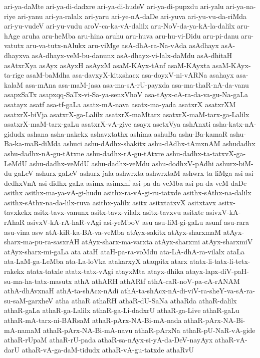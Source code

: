 {ari-ya-daMte
ari-ya-di-dadxre
ari-ya-di-hudeV
ari-ya-di-pupxdu
ari-yalu
ari-ya-na-riye
ari-yanu
ari-ya-ralalx
ari-yaru
ari-ye-nA-daDe
ari-yuva
ari-yu-vu-da-riMda
ari-yu-vudeV
ari-yu-vudu
aroV-ca-ka-vA-dalilx
aru-NoV-da-ya-kA-la-dalilx
aru-hAge
aruha
aru-heMba
aru-hina
aruhu
aru-huva
aru-hu-vi-Didu
aru-pi-danu
aru-vatutx
aru-va-tutx-nAlukx
aru-viMge
asA-dhA-ra-Na-vAda
asAdhayx
asA-dhayxva
asA-dhayx-veM-bu-danunx
asA-dhayx-vi-lalx-daMdu
asA-dhitaH
asAtxrXya
asAyx
asAyxH
asAyxM
asaM-KAyx-tAnf
asaM-KAyxta
asaM-KAyx-ta-rige
asaM-baMdha
asa-davxyX-kitxshacx
asa-doyxV-ni-vARNa
asahayx
asa-kalaM
asa-mAna
asa-maM-jasa
asa-ma-sA-rU-payxda
asa-ma-thaR-nA-da-vanu
asapxSaTx
asapxqq-SaTx-vi-Sa-ya-senxVhoV
asa-tAyx-cA-ra-da-va-gu-Na-gaLa
asatayx
asatf
asa-tf-gaLa
asatx-mA-nava
asatx-ma-yada
asatxrX
asatxrXM
asatxrX-biVja
asatxrX-ga-Lalilx
asatxrX-maMtarx
asatxrX-maM-tarx-ga-Lalilx
asatxrX-maM-tarx-gaLu
asatxrX-vA-give
asayx
asetxVya
ashAnxti
asha-katx-nA-gidudx
ashana
asha-nakekx
ashavxtathx
ashima
ashuBa
ashu-Ba-kamaR
ashu-Ba-ka-maR-diMda
ashuci
ashu-dAdhx-shakitx
ashu-dAdhx-tAmxnAM
ashudadhx
ashu-dadhx-nA-gu-tAtxne
ashu-dadhx-rA-gu-tAtxre
ashu-dadhx-ta-tatxvX-ga-LeMdU
ashu-dadhx-veMdU
ashu-dadhx-veMdu
ashu-dodhxV-pAdhi
ashurx-biM-du-gaLeV
ashurx-gaLeV
ashurx-jala
ashwrxta
ashwrxtaM
ashwrx-ta-liMga
asi
asi-dedhxVnA
asi-didhx-gaLa
asimx
asimxnf
asi-pa-da-veMba
asi-pa-da-veM-daDe
asithx
asithx-ma-ya-vA-gi-hudu
asithx-ra-vA-gi-ru-tatxde
asithx-sAthx-na-dalilx
asithx-sAthx-na-da-lilx-ruva
asithx-yalilx
asitx
asitxtatxvX
asitxtavx
asitx-tavxkekx
asitx-tavx-vanunx
asitx-tavx-vilalx
asitx-tavxvu
asitxte
asivxV-kA-rAhaR
asivxV-kA-rA-haR-vAgi
asi-yeMboV
asu
asu-liM-gi-gaLu
asunf
asu-rara
asu-vina
asw
atA-kiR-ka-BA-va-veMba
atAyx-sakitx
atAyx-sharxmaM
atAyx-sharx-ma-pu-ra-sasxrAH
atAyx-sharx-ma-varxta
atAyx-sharxmi
atAyx-sharxmiV
atAyx-sharx-mi-gaLa
ata
ataH
ataH-pa-ra-voMdu
ata-LA-dhA-ra-vilalx
ataLa
ata-LaM-ga-LeMba
ata-La-loVka
atakarxyX
ataqpitx
atarx
atatx-li-tatx-li-tetx-rakekx
atatx-tatxle
atatx-tatx-vAgi
atayxMta
atayx-dhika
atayx-lapx-diV-paH-su-ma-ha-tatx-masutx
athA
athARH
athARtf
athA-caR-noV-pa-cA-rANAM
athA-dhAvxnaH
athA-ta-shAcx-nAdi
athA-ta-shAcx-nA-di-viV-ra-sheY-va-sA-ra-su-saM-garxheV
atha
athaR
athaRH
athaR-dU-SaNa
athaRda
athaR-dalilx
athaR-gaLa
athaR-ga-Lalilx
athaR-ga-Li-dadxrU
athaR-ga-Live
athaR-gaLu
athaR-mA-tarx-ni-BARsaM
athaR-pArx-NA-Bi-mA-nada
athaR-pArx-NA-Bi-mA-namaM
athaR-pArx-NA-Bi-mA-navu
athaR-pArxNa
athaR-pU-NaR-vA-gide
athaR-rUpaM
athaR-rU-pada
athaR-sa-nAyx-si-yA-da-DeV-nayAyx
athaR-vA-darU
athaR-vA-ga-daM-tidudx
athaR-vA-gu-tatxde
athaRvU
}
